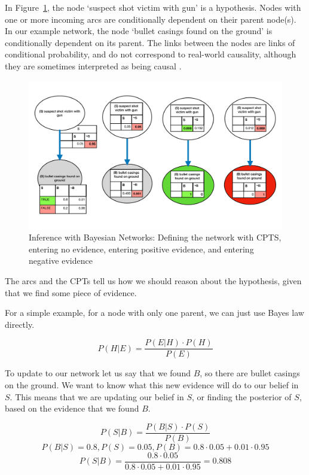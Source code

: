 \documentclass[12pt]{article}
\begin{document}
In Figure~\ref{exampleBN}, the node `suspect shot victim with gun' is a hypothesis. Nodes with one or more incoming arcs are conditionally dependent on their parent node(s). In our example network, the node `bullet casings found on the ground' is conditionally dependent on its parent. The links between the nodes are links of conditional probability, and do not correspond to real-world causality, although they are sometimes interpreted as being causal \citep{Dawid2008}.

\begin{figure}[htbp]
\begin{center}
\includegraphics[width=\linewidth]{images/basicBayes}
\caption{Inference with Bayesian Networks: Defining the network with CPTS, entering no evidence, entering positive evidence, and entering negative evidence}
\label{exampleBN}
\end{center}
\end{figure}


The arcs and the CPTs tell us how we should reason about the hypothesis, given that we find some piece of evidence.


For a simple example, for a node with only one parent, we can just use Bayes law directly.


\[ P(H | E) =  \frac{P(E | H) \cdot P(H)}{P(E)}\]


To update to our network let us say that we found $B$, so there are bullet casings on the ground. We want to know what this new evidence will do to our belief in $S$. This means that we are updating our belief in $S$, or finding the posterior of $S$, based on the evidence that we found $B$.

\[ P(S | B) =  \frac{P(B | S) \cdot P(S)}{P(B)}\]
\[ P(B | S) = 0.8, P(S) = 0.05, P(B) = 0.8 \cdot 0.05 + 0.01 \cdot 0.95\]
\[ P(S | B) =  \frac{0.8 \cdot 0.05}{0.8 \cdot 0.05 + 0.01 \cdot 0.95} = 0.808\]
\end{document}
